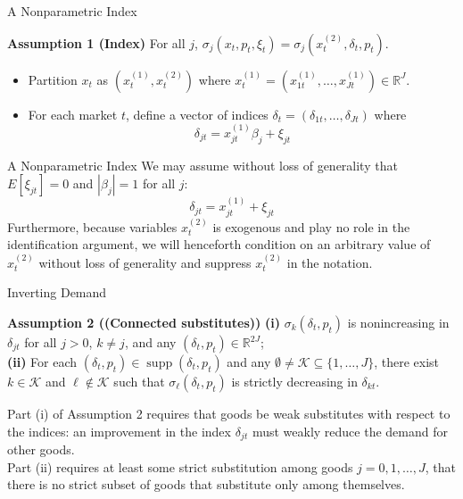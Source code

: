 \documentclass[aspectratio=169]{beamer}  %
\begin{document}
\begin{frame}{A Nonparametric Index}
    \begin{block}{\textbf{Assumption 1 (Index)}}
        For all \(j\), \(\sigma_j(x_t, p_t, \xi_t) = \sigma_j\left(x_t^{(2)}, \delta_t, p_t\right)\).
    \end{block}
    \begin{itemize}
        \item Partition \(x_t\) as \((x_t^{(1)}, x_t^{(2)})\) where \(x_t^{(1)} = (x_{1t}^{(1)}, \ldots, x_{Jt}^{(1)}) \in \mathbb{R}^J\).
        \item For each market \(t\), define a vector of indices \(\delta_t = (\delta_{1t}, \ldots, \delta_{Jt})\) where
    \begin{equation}
        \delta_{jt} = x_{jt}^{(1)} \beta_j + \xi_{jt}
    \end{equation}
    \end{itemize}
\end{frame}

\begin{frame}{A Nonparametric Index}
    We may assume without loss of generality that \(E[\xi_{jt}] = 0\) and \(|\beta_j| = 1\) for all \(j\):
    \begin{equation}
        \delta_{jt} = x_{jt}^{(1)} + \xi_{jt}
    \end{equation}
    Furthermore, because variables \(x_t^{(2)}\) is exogenous and play no role in the identification argument, we will henceforth condition on an arbitrary value of \(x_t^{(2)}\) without loss of generality and suppress \(x_t^{(2)}\) in the notation.
\end{frame}

\begin{frame}{Inverting Demand}
    \begin{block}{\textbf{Assumption 2 ((Connected substitutes))}}
    \textbf{(i)} \(\sigma_{k}(\delta_t, p_t)\) is nonincreasing in \(\delta_{jt}\) for all \(j > 0\), \(k \neq j\), and any \((\delta_t, p_t) \in \mathbb{R}^{2J}\); \\
    \textbf{(ii)} For each \((\delta_t, p_t) \in \operatorname{supp}(\delta_t, p_t)\) and any \(\emptyset \neq \mathcal{K} \subseteq \{1, \ldots, J\}\), there exist \(k \in \mathcal{K}\) and \(\ell \notin \mathcal{K}\) such that \(\sigma_{\ell}(\delta_t, p_t)\) is strictly decreasing in \(\delta_{kt}\).
    \end{block}
    Part (i) of Assumption 2 requires that goods be weak substitutes with respect to the indices: an improvement in the index \(\delta_{jt}\) must weakly reduce the demand for other goods.\\
    Part (ii) requires at least some strict substitution among goods \(j = 0, 1, \ldots, J\), that there is no strict subset of goods that substitute only among themselves.
\end{frame}
\end{document}
